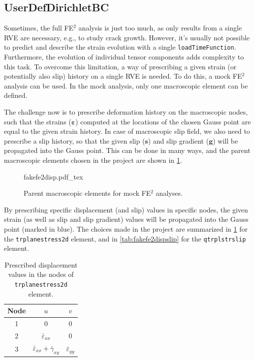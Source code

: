 \documentclass[11pt]{article}
\begin{document}
\subsection{UserDefDirichletBC}

Sometimes, the full FE$^2$ analysis is just too much, as only results from a single RVE are necessary, e.g., to study crack growth. 
However, it's usually not possible to predict and describe the strain evolution with a single \texttt{loadTimeFunction}. Furthermore, the evolution of individual tensor components adds complexity to this task.
To overcome this limitation, a way of prescribing a given strain (or potentially also slip) history on a single RVE is needed. 
To do this, a mock FE$^2$ analysis can be used. In the mock analysis, only one macroscopic element can be defined. 

The challenge now is to prescribe deformation history on the macroscopic nodes, such that the strains ($\bm{\varepsilon}$) computed at the locations of the chosen Gauss point are equal to the given strain history. In case of macroscopic slip field, we also need to prescribe a slip history, so that the given slip ($\bm{s}$) and slip gradient ($\bm{g}$) will be propagated into the Gauss point. This can be done in many ways, and the parent macroscopic elements chosen in the project are shown in \cref{fig:fakefe2}.

\begin{figure}[H]
    \centering
    \def\svgwidth{0.8\textwidth}
    {fakefe2disp.pdf_tex}
    \caption{Parent macroscopic elements for mock FE$^2$ analyses.}
    \label{fig:fakefe2}
\end{figure}

\noindent By prescribing specific displacement (and slip) values in specific nodes, the given strain (as well as slip and slip gradient) values will be propagated into the Gauss point (marked in blue). The choices made in the project are summarized in \cref{tab:fakefe2disp} for the \texttt{trplanestress2d} element, and in \cref{tab:fakefe2dispslip} for the \texttt{qtrplstrslip} element.

\begin{table}[H]
    \centering
    \caption{Prescribed displacement values in the nodes of \texttt{trplanestress2d} element.}
    \begin{tabular}{|c|c|c|}
    \hline
    \textbf{Node} & $u$                                      & $v$                    \\ \hline
    1    & $0$                                        & $0$                      \\ \hline
    2    & $\bar{\varepsilon}_{xx}$                   & $0$                      \\ \hline
    3    & $\bar{\varepsilon}_{xx}+\bar{\gamma}_{xy}$ & $\bar{\varepsilon}_{yy}$ \\ \hline
    \end{tabular}
    \label{tab:fakefe2disp}
\end{table}
\end{document}
